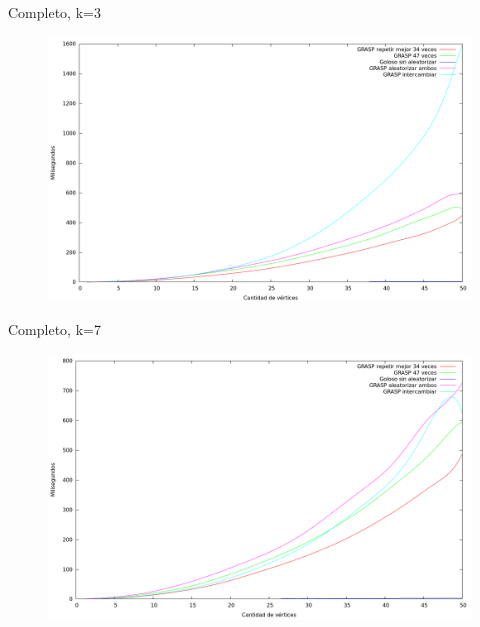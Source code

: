 \vspace*{0.5cm}

Completo, k=3
\vspace*{0.5cm}

\begin{figure}[H]
  \begin{center}
    \includegraphics[scale=0.35]{imagenes/ej6-completo-k3-tiempo.png}
  \end{center}
\end{figure}

\vspace*{0.5cm}

Completo, k=7
\vspace*{0.5cm}

\begin{figure}[H]
  \begin{center}
    \includegraphics[scale=0.35]{imagenes/ej6-completo-k7-tiempo.png}
  \end{center}
\end{figure}

